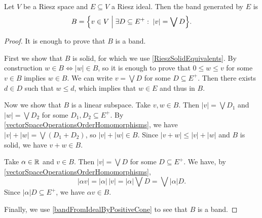 \begin{proposition} \label{bandGeneratedByRieszIdeal}
Let $V$ be a Riesz space and $E\subseteq V$ a Riesz ideal. Then the band generated by $E$ is
\[ B = \setbuilder{v\in V}{\exists D\subseteq E^+: \; |v| = \bigvee D}. \]
\end{proposition}
\begin{proof}
It is enough to prove that $B$ is a band.

First we show that $B$ is solid, for which we use \ref{RieszSolidEquivalents}. By construction $w\in B \iff |w| \in B$, so it is enough to prove that $0\leq w \leq v$ for some $v\in B$ implies $w\in B$. We can write $v = \bigvee D$ for some $D\subseteq E^+$. Then there exists $d\in D$ such that $w \leq d$, which implies that $w\in E$ and thus in $B$.

Now we show that $B$ is a linear subspace. Take $v,w\in B$. Then $|v| = \bigvee D_1$ and $|w| = \bigvee D_2$ for some $D_1, D_2\subseteq E^+$. By \ref{vectorSpaceOperationsOrderHomomorphisms}, we have $|v|+|w| = \bigvee (D_1+D_2)$, so $|v|+|w|\in B$. Since $|v+w|\leq |v|+|w|$ and $B$ is solid, we have $v+w\in B$.

Take $\alpha\in \mathbb{R}$ and $v\in B$. Then $|v| = \bigvee D$ for some $D\subseteq E^+$. We have, by \ref{vectorSpaceOperationsOrderHomomorphisms},
\[ |\alpha v| = |\alpha|\,|v| = |\alpha|\bigvee D = \bigvee |\alpha|D. \]
Since $|\alpha|D\subseteq E^+$, we have $\alpha v\in B$.

Finally, we use \ref{bandFromIdealByPositiveCone} to see that $B$ is a band.
\end{proof}

